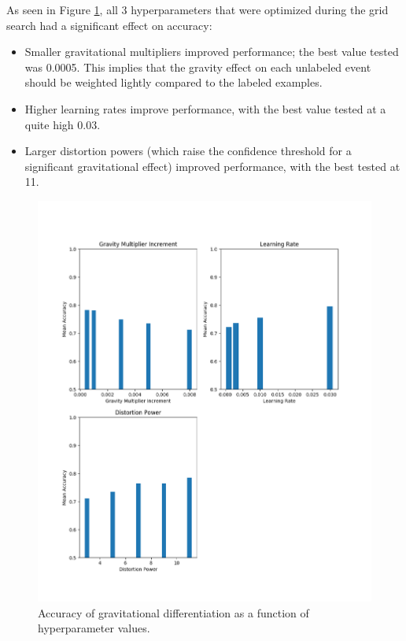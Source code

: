\documentclass[10pt]{article}
\begin{document}
As seen in Figure \ref{grav_acc_by_hyper}, all 3 hyperparameters that were optimized during the grid search had a significant effect on accuracy:
\begin{itemize}
    \item Smaller gravitational multipliers improved performance; the best value tested was 0.0005. This implies that the gravity effect on each unlabeled event should be weighted lightly compared to the labeled examples.
    \item Higher learning rates improve performance, with the best value tested at a quite high 0.03.
    \item Larger distortion powers (which raise the confidence threshold for a significant gravitational effect) improved performance, with the best tested at 11.
\end{itemize}

\begin{figure}[h]
    \centering
    \includegraphics[width=\textwidth]{grav_acc_by_hyper}
    \caption{\label{grav_acc_by_hyper} Accuracy of gravitational differentiation as a function of hyperparameter values.}
\end{figure}
\end{document}
